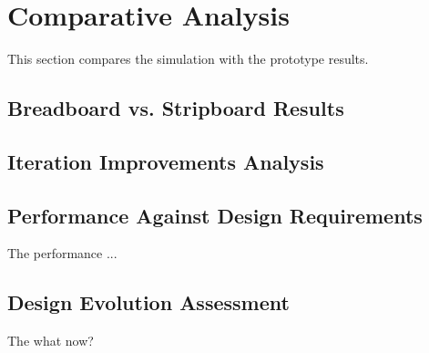 \section{Comparative Analysis}
 This section compares the simulation with the prototype results.
\subsection{Breadboard vs. Stripboard Results}

\subsection{Iteration Improvements Analysis}

\subsection{Performance Against Design Requirements}
The performance ...

\subsection{Design Evolution Assessment}
The what now?


%

